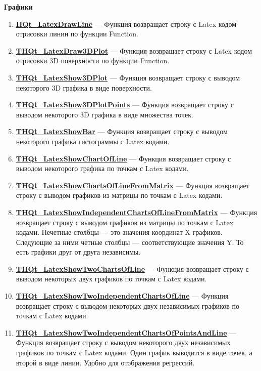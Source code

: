 \documentclass[a4paper,12pt]{article}
\begin{document}
\textbf{Графики}
\begin{enumerate}

\item \textbf{\hyperref[HQt_LatexDrawLine]{HQt\_LatexDrawLine}} --- Функция возвращает строку с Latex кодом отрисовки линии по функции Function.

\item \textbf{\hyperref[THQt_LatexDraw3DPlot]{THQt\_LatexDraw3DPlot}} --- Функция возвращает строку с Latex кодом отрисовки 3D поверхности по функции Function.

\item \textbf{\hyperref[THQt_LatexShow3DPlot]{THQt\_LatexShow3DPlot}} --- Функция возвращает строку с выводом некоторого 3D графика в виде поверхности.

\item \textbf{\hyperref[THQt_LatexShow3DPlotPoints]{THQt\_LatexShow3DPlotPoints}} --- Функция возвращает строку с выводом некоторого 3D графика в виде множества точек.

\item \textbf{\hyperref[THQt_LatexShowBar]{THQt\_LatexShowBar}} --- Функция возвращает строку с выводом некоторого графика гистограммы с Latex кодами.

\item \textbf{\hyperref[THQt_LatexShowChartOfLine]{THQt\_LatexShowChartOfLine}} --- Функция возвращает строку с выводом некоторого графика по точкам с Latex кодами.

\item \textbf{\hyperref[THQt_LatexShowChartsOfLineFromMatrix]{THQt\_LatexShowChartsOfLineFromMatrix}} --- Функция возвращает строку с выводом графиков из матрицы по точкам с Latex кодами.

\item \textbf{\hyperref[THQt_LatexShowIndependentChartsOfLineFromMatrix]{THQt\_LatexShowIndependentChartsOfLineFromMatrix}} --- Функция возвращает строку с выводом графиков из матрицы по точкам с Latex кодами. Нечетные столбцы --- это значения координат X графиков. Следующие за ними четные столбцы --- соответствующие значения Y. То есть графики друг от друга независимы.

\item \textbf{\hyperref[THQt_LatexShowTwoChartsOfLine]{THQt\_LatexShowTwoChartsOfLine}} --- Функция возвращает строку с выводом некоторых двух графиков по точкам с Latex кодами.

\item \textbf{\hyperref[THQt_LatexShowTwoIndependentChartsOfLine]{THQt\_LatexShowTwoIndependentChartsOfLine}} --- Функция возвращает строку с выводом некоторых двух независимых графиков по точкам с Latex кодами.

\item \textbf{\hyperref[THQt_LatexShowTwoIndependentChartsOfPointsAndLine]{THQt\_LatexShowTwoIndependentChartsOfPointsAndLine}} --- Функция возвращает строку с выводом некоторого двух независимых графиков по точкам с Latex кодами. Один график выводится в виде точек, а второй в виде линии. Удобно для отображения регрессий.

\end{enumerate}
\end{document}
